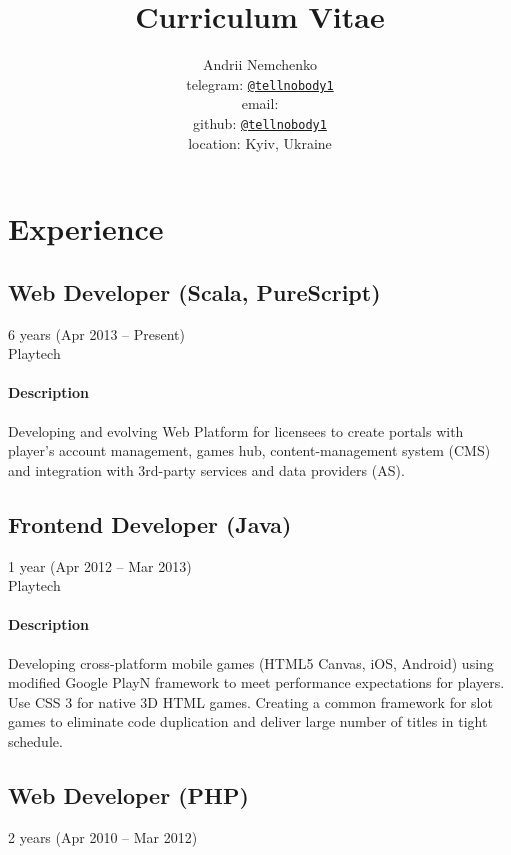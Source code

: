 

\title{Curriculum Vitae}
\author{
  Andrii Nemchenko\\
  telegram: \href{https://t.me/tellnobody1}{\nolinkurl{@tellnobody1}}\\
  email: \\
  github: \href{https://github.com/tellnobody1}{\nolinkurl{@tellnobody1}}\\
  location: Kyiv, Ukraine
}
\maketitle
\section{Experience}
\subsection{Web Developer (Scala, PureScript)}
6 years (Apr 2013 – Present)\\
Playtech
\paragraph{Description}
Developing and evolving Web Platform for licensees to create portals with player's account management, games hub, content-management system (CMS) and integration with 3rd-party services and data providers (AS).
\subsection{Frontend Developer (Java)}
1 year (Apr 2012 – Mar 2013)\\Playtech
\paragraph{Description}
Developing cross-platform mobile games (HTML5 Canvas, iOS, Android) using modified Google PlayN framework to meet performance expectations for players. Use CSS 3 for native 3D HTML games. Creating a common framework for slot games to eliminate code duplication and deliver large number of titles in tight schedule.
\subsection{Web Developer (PHP)}
2 years (Apr 2010 – Mar 2012)
